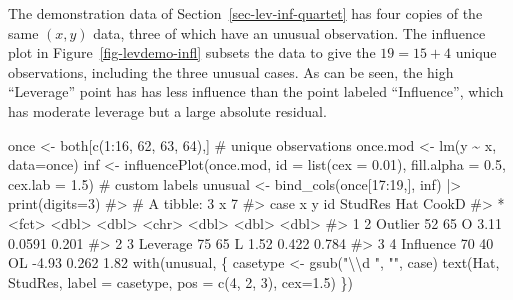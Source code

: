 \documentclass[
  letterpaper,
  10pt,
  krantz2]{krantz}
\makeatletter
\newenvironment{Shaded}{\begin{snugshade}}{\end{snugshade}}
\newcommand{\AttributeTok}[1]{\textcolor[rgb]{0.40,0.45,0.13}{#1}}
\newcommand{\CommentTok}[1]{\textcolor[rgb]{0.37,0.37,0.37}{#1}}
\newcommand{\DecValTok}[1]{\textcolor[rgb]{0.68,0.00,0.00}{#1}}
\newcommand{\FloatTok}[1]{\textcolor[rgb]{0.68,0.00,0.00}{#1}}
\newcommand{\FunctionTok}[1]{\textcolor[rgb]{0.28,0.35,0.67}{#1}}
\newcommand{\NormalTok}[1]{\textcolor[rgb]{0.00,0.23,0.31}{#1}}
\newcommand{\OtherTok}[1]{\textcolor[rgb]{0.00,0.23,0.31}{#1}}
\newcommand{\SpecialCharTok}[1]{\textcolor[rgb]{0.37,0.37,0.37}{#1}}
\newcommand{\StringTok}[1]{\textcolor[rgb]{0.13,0.47,0.30}{#1}}
\newenvironment{kframe}{%
  \medskip{}
  \setlength{\fboxsep}{.8em}
  \def\at@end@of@kframe{}%
  \ifinner\ifhmode%
  \def\at@end@of@kframe{\end{minipage}}%
  \begin{minipage}{\columnwidth}%
  \fi\fi%
  \def\FrameCommand##1{\hskip\@totalleftmargin \hskip-\fboxsep
  \colorbox{shadecolor}{##1}\hskip-\fboxsep
      \hskip-\linewidth \hskip-\@totalleftmargin \hskip\columnwidth}%
  \MakeFramed {\advance\hsize-\width
    \@totalleftmargin\z@ \linewidth\hsize
    \@setminipage}}%
{\par\unskip\endMakeFramed%
  \at@end@of@kframe}
\renewenvironment{Shaded}{\begin{kframe}}{\end{kframe}}
\makeatother
\begin{document}
The demonstration data of Section~\ref{sec-lev-inf-quartet} has four
copies of the same \((x, y)\) data, three of which have an unusual
observation. The influence plot in Figure~\ref{fig-levdemo-infl} subsets
the data to give the \(19 = 15 + 4\) unique observations, including the
three unusual cases. As can be seen, the high ``Leverage'' point has has
less influence than the point labeled ``Influence'', which has moderate
leverage but a large absolute residual.

\begin{Shaded}
\begin{Highlighting}[]
\NormalTok{once }\OtherTok{\textless{}{-}}\NormalTok{ both[}\FunctionTok{c}\NormalTok{(}\DecValTok{1}\SpecialCharTok{:}\DecValTok{16}\NormalTok{, }\DecValTok{62}\NormalTok{, }\DecValTok{63}\NormalTok{, }\DecValTok{64}\NormalTok{),]      }\CommentTok{\# unique observations}
\NormalTok{once.mod }\OtherTok{\textless{}{-}} \FunctionTok{lm}\NormalTok{(y }\SpecialCharTok{\textasciitilde{}}\NormalTok{ x, }\AttributeTok{data=}\NormalTok{once)}
\NormalTok{inf }\OtherTok{\textless{}{-}} \FunctionTok{influencePlot}\NormalTok{(once.mod, }
                     \AttributeTok{id =} \FunctionTok{list}\NormalTok{(}\AttributeTok{cex =} \FloatTok{0.01}\NormalTok{),}
                     \AttributeTok{fill.alpha =} \FloatTok{0.5}\NormalTok{,}
                     \AttributeTok{cex.lab =} \FloatTok{1.5}\NormalTok{)}
\CommentTok{\# custom labels}
\NormalTok{unusual }\OtherTok{\textless{}{-}} \FunctionTok{bind\_cols}\NormalTok{(once[}\DecValTok{17}\SpecialCharTok{:}\DecValTok{19}\NormalTok{,], inf) }\SpecialCharTok{|\textgreater{}} 
  \FunctionTok{print}\NormalTok{(}\AttributeTok{digits=}\DecValTok{3}\NormalTok{)}
\CommentTok{\#\textgreater{} \# A tibble: 3 x 7}
\CommentTok{\#\textgreater{}   case            x     y id    StudRes    Hat CookD}
\CommentTok{\#\textgreater{} * \textless{}fct\textgreater{}       \textless{}dbl\textgreater{} \textless{}dbl\textgreater{} \textless{}chr\textgreater{}   \textless{}dbl\textgreater{}  \textless{}dbl\textgreater{} \textless{}dbl\textgreater{}}
\CommentTok{\#\textgreater{} 1 2 Outlier      52    65 O        3.11 0.0591 0.201}
\CommentTok{\#\textgreater{} 2 3 Leverage     75    65 L        1.52 0.422  0.784}
\CommentTok{\#\textgreater{} 3 4 Influence    70    40 OL      {-}4.93 0.262  1.82}
\FunctionTok{with}\NormalTok{(unusual, \{}
\NormalTok{  casetype }\OtherTok{\textless{}{-}} \FunctionTok{gsub}\NormalTok{(}\StringTok{"}\SpecialCharTok{\textbackslash{}\textbackslash{}}\StringTok{d "}\NormalTok{, }\StringTok{""}\NormalTok{, case)}
  \FunctionTok{text}\NormalTok{(Hat, StudRes, }\AttributeTok{label =}\NormalTok{ casetype,}
       \AttributeTok{pos =} \FunctionTok{c}\NormalTok{(}\DecValTok{4}\NormalTok{, }\DecValTok{2}\NormalTok{, }\DecValTok{3}\NormalTok{), }\AttributeTok{cex=}\FloatTok{1.5}\NormalTok{)}
\NormalTok{\})}
\end{Highlighting}
\end{Shaded}
\end{document}
